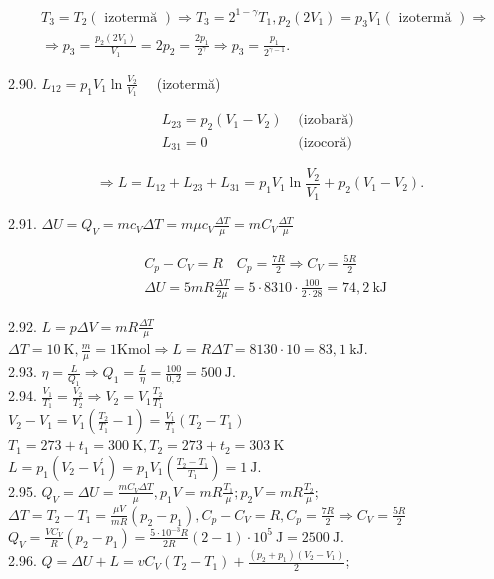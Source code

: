 \documentclass[10pt]{article}
\begin{document}
$$
\begin{aligned}
& T_{3}=T_{2}(\text { izotermă }) \Rightarrow T_{3}=2^{1-\gamma} T_{1}, p_{2}\left(2 V_{1}\right)=p_{3} V_{1}(\text { izotermă }) \Rightarrow \\
& \Rightarrow p_{3}=\frac{p_{2}\left(2 V_{1}\right)}{V_{1}}=2 p_{2}=\frac{2 p_{1}}{2^{\gamma}} \Rightarrow p_{3}=\frac{p_{1}}{2^{\gamma-1}} .
\end{aligned}
$$

2.90. $L_{12}=p_{1} V_{1} \ln \frac{V_{2}}{V_{1}} \quad$ (izotermă)

$$
\begin{array}{ll}
L_{23}=p_{2}\left(V_{1}-V_{2}\right) & \text { (izobară) } \\
L_{31}=0 & \text { (izocoră) }
\end{array}
$$

$$
\Rightarrow L=L_{12}+L_{23}+L_{31}=p_{1} V_{1} \ln \frac{V_{2}}{V_{1}}+p_{2}\left(V_{1}-V_{2}\right) .
$$

2.91. $\Delta U=Q_{V}=m c_{V} \Delta T=m \mu c_{V} \frac{\Delta T}{\mu}=m C_{V} \frac{\Delta T}{\mu}$

$$
\begin{aligned}
& C_{p}-C_{V}=R \quad C_{p}=\frac{7 R}{2} \Rightarrow C_{V}=\frac{5 R}{2} \\
& \Delta U=5 m R \frac{\Delta T}{2 \mu}=5 \cdot 8310 \cdot \frac{100}{2 \cdot 28}=74,2 \mathrm{~kJ}
\end{aligned}
$$

2.92. $L=p \Delta V=m R \frac{\Delta T}{\mu}$ $\Delta T=10 \mathrm{~K}, \frac{m}{\mu}=1 \mathrm{Kmol} \Rightarrow L=R \Delta T=8130 \cdot 10=83,1 \mathrm{~kJ}$.\\
2.93. $\eta=\frac{L}{Q_{1}} \Rightarrow Q_{1}=\frac{L}{\eta}=\frac{100}{0,2}=500 \mathrm{~J}$.\\
2.94. $\frac{V_{1}}{T_{1}}=\frac{V_{2}}{T_{2}} \Rightarrow V_{2}=V_{1} \frac{T_{2}}{T_{1}}$\\
$V_{2}-V_{1}=V_{1}\left(\frac{T_{2}}{T_{1}}-1\right)=\frac{V_{1}}{T_{1}}\left(T_{2}-T_{1}\right)$\\
$T_{1}=273+t_{1}=300 \mathrm{~K}, T_{2}=273+t_{2}=303 \mathrm{~K}$\\
$L=p_{1}\left(V_{2}-V_{1}^{\prime}\right)=p_{1} V_{1}\left(\frac{T_{2}-T_{1}}{T_{1}}\right)=1 \mathrm{~J}$.\\
2.95. $Q_{V}=\Delta U=\frac{m C_{V} \Delta T}{\mu}, p_{1} V=m R \frac{T_{1}}{\mu} ; p_{2} V=m R \frac{T_{2}}{\mu}$;\\
$\Delta T=T_{2}-T_{1}=\frac{\mu V}{m R}\left(p_{2}-p_{1}\right), C_{p}-C_{V}=R, C_{p}=\frac{7 R}{2} \Rightarrow C_{V}=\frac{5 R}{2}$\\
$Q_{V}=\frac{V C_{V}}{R}\left(p_{2}-p_{1}\right)=\frac{5 \cdot 10^{-3} R}{2 R}(2-1) \cdot 10^{5} \mathrm{~J}=2500 \mathrm{~J}$.\\
2.96. $Q=\Delta U+L=v C_{V}\left(T_{2}-T_{1}\right)+\frac{\left(p_{2}+p_{1}\right)\left(V_{2}-V_{1}\right)}{2}$;
\end{document}
